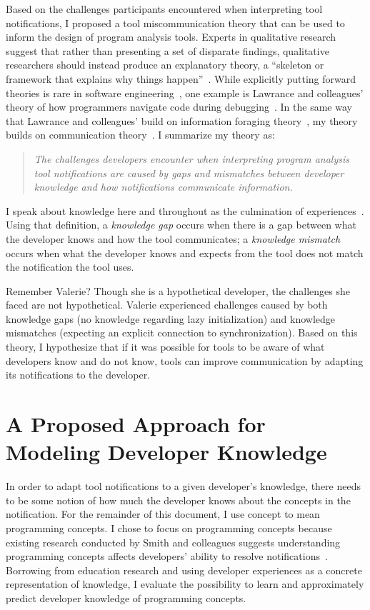 \documentclass{llncs}
\begin{document}
Based on the challenges participants encountered when interpreting tool notifications, I proposed a tool miscommunication theory that can be used to inform the design of program analysis tools.
Experts in qualitative research suggest that rather than presenting a set of disparate findings, qualitative researchers should instead produce an explanatory theory, a ``skeleton or framework that explains why things happen''~\cite{corbin2014basics}. While explicitly putting forward theories is rare in software engineering~\cite{hannay2007systematic}, one example is Lawrance and colleagues' theory of how programmers navigate code during debugging~\cite{lawrance2013programmers}. In the same way that Lawrance and colleagues' build on 
information foraging theory~\cite{pirolli1999information}, my theory builds on communication theory~\cite{bowman1987modeling}.
I summarize my theory as:

\begin{quotation}
	\noindent
	\emph{The challenges developers encounter when interpreting program analysis tool notifications are caused by gaps and mismatches between developer knowledge and how notifications communicate information.}
\end{quotation}

I speak about knowledge here and throughout as the culmination of experiences~\cite{johnson1989mental,argote2011organizational}.
Using that definition, a \emph{knowledge gap} occurs when there is a gap between what the developer knows and how the tool communicates; a \emph{knowledge mismatch} occurs when what the developer knows and expects from the tool does not match the notification the tool uses.

Remember Valerie? Though she is a hypothetical developer, the challenges she faced are not hypothetical. Valerie experienced challenges caused by both knowledge gaps (no knowledge regarding lazy initialization) and knowledge mismatches (expecting an explicit connection to synchronization). Based on this theory, I hypothesize that if it was possible for tools to be aware of what developers know and do not know, tools can improve communication by adapting its notifications to the developer.

\section{A Proposed Approach for Modeling Developer Knowledge}
In order to adapt tool notifications to a given developer's knowledge, there needs to be some notion of how much the developer knows about the concepts in the notification. For the remainder of this document, I use concept to mean programming concepts. I chose to focus on programming concepts because existing research conducted by Smith and colleagues suggests understanding programming concepts affects developers' ability to resolve notifications~\cite{smith2015questions}. Borrowing from education research and using developer experiences as a concrete representation of knowledge, I evaluate the possibility to learn and approximately predict developer knowledge of programming concepts.
\end{document}
